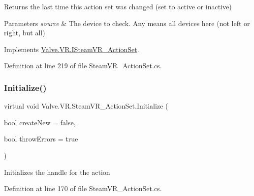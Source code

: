 Returns the last time this action set was changed (set to active or inactive) 


\begin{DoxyParams}{Parameters}
{\em source} & The device to check. Any means all devices here (not left or right, but all)\\
\hline
\end{DoxyParams}


Implements \mbox{\hyperlink{interface_valve_1_1_v_r_1_1_i_steam_v_r___action_set_a7c8434a48c12c5b70f6cbfd1f2bca5be}{Valve.\+V\+R.\+I\+Steam\+V\+R\+\_\+\+Action\+Set}}.



Definition at line 219 of file Steam\+V\+R\+\_\+\+Action\+Set.\+cs.

\mbox{\label{class_valve_1_1_v_r_1_1_steam_v_r___action_set_a1f0049b024089d6ce2d2a71a19ef5c31}} 
\subsubsection{\texorpdfstring{Initialize()}{Initialize()}}
{\footnotesize\ttfamily virtual void Valve.\+V\+R.\+Steam\+V\+R\+\_\+\+Action\+Set.\+Initialize (\begin{DoxyParamCaption}\item[{bool}]{create\+New = {\ttfamily false},  }\item[{bool}]{throw\+Errors = {\ttfamily true} }\end{DoxyParamCaption})\hspace{0.3cm}{\ttfamily [virtual]}}



Initializes the handle for the action 



Definition at line 170 of file Steam\+V\+R\+\_\+\+Action\+Set.\+cs.

\mbox{\label{class_valve_1_1_v_r_1_1_steam_v_r___action_set_a90637da41a53066829ee8bd3e06a3ce9}} 
